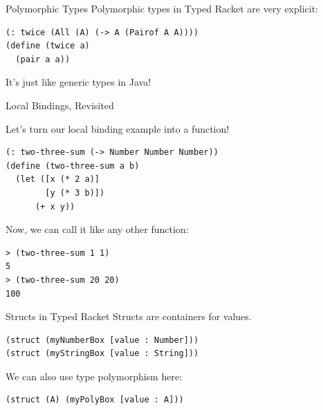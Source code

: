 \documentclass{beamer}
\begin{document}
\begin{frame}[fragile]{Polymorphic Types}
Polymorphic types in Typed Racket are very explicit:

\begin{lstlisting}
(: twice (All (A) (-> A (Pairof A A))))
(define (twice a)
  (pair a a))
\end{lstlisting}

\pause{}

\vspace{0.5cm}


\vspace{1cm}

\pause{}

It's just like generic types in Java!
\end{frame}

\begin{frame}[fragile]{Local Bindings, Revisited}

Let's turn our local binding example into a function!

\begin{lstlisting}
(: two-three-sum (-> Number Number Number))
(define (two-three-sum a b)
  (let ([x (* 2 a)]
        [y (* 3 b)])
      (+ x y))
\end{lstlisting}

\pause{}

Now, we can call it like any other function:

\begin{lstlisting}
> (two-three-sum 1 1)
5
> (two-three-sum 20 20)
100
\end{lstlisting}
\end{frame}

\begin{frame}[fragile]{Structs in Typed Racket}
Structs are containers for values.

\begin{lstlisting}
(struct (myNumberBox [value : Number]))
(struct (myStringBox [value : String]))
\end{lstlisting}

\pause{}

We can also use type polymorphism here:

\begin{lstlisting}
(struct (A) (myPolyBox [value : A]))
\end{lstlisting}
\end{frame}
\end{document}
